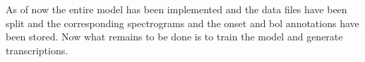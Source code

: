\documentclass[a4paper]{article}
\begin{document}
As of now the entire model has been implemented and the data files have been split and the corresponding spectrograms and the onset and bol annotations have been stored. Now what remains to be done is to train the model and generate transcriptions.




\end{document}

